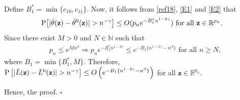 \documentclass[twoside]{article}
\newcommand{\bz}{\mathbf{z}}
\newcommand{\0}{\mathbf{0}}
\newcommand{\1}{\mathbf{1}}
\newcommand*{\QEDB}{\hfill\ensuremath{\square}}
\numberwithin{equation}{section}
\begin{document}
\begin{enumerate}[(a)]
\begin{align}
\end{align}
Define $B^*_1 = \min\{c_{10},c_{11}\}$. Now, it follows from \eqref{ref18}, \eqref{E1} and \eqref{E2} that $${\rm P}\big [|\bar{\theta}(\bz) - \bar{\theta}^0(\bz)|>n^{-\gamma} \big]\leq O(p_n e^{-B^*_1 n^{1-2\gamma}})\text{ for all }\bz\in\mathbb{R}^{p_n}.$$
Since there exist $M>0$ and $N\in\mathbb{N}$ such that
\begin{align*}
&\ p_n\le e^{Mn^\beta}
\Rightarrow  p_ne^{-B^*_1 n^{1-2\gamma}}\le e^{-B_1\{ n^{1-2\gamma}-n^\beta\}}\text{ for all }n\ge N,
\end{align*}
where $B_1=\min\{B^*_1,M\}.$ Therefore, ${\rm P}\left [|\bar{L}(\bz)- \bar{L}^0(\bz) |>n^{-\gamma}\right ]\leq O\left (e^{-B_1\{ n^{1-2\gamma}-n^\beta\}}\right )$ for all $\bz\in\mathbb{R}^{p_n}.$
\end{enumerate}
Hence, the proof.
\hfill \QEDB\newline

\end{document}
